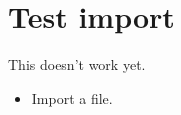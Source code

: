 \chapter{Test import}
\label{autosec:9}
This doesn't work yet.
    \begin{itemize}[noitemsep]
        \item {\color{red}Import a file.}
    \end{itemize}

